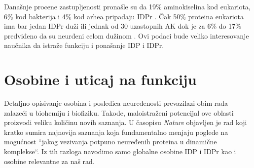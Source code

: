 Današnje procene zastupljenosti pronašle su da 19\% aminokiselina kod
eukariota, 6\% kod bakterija i 4\% kod arhea pripadaju
IDPr \parencite{peng2015b}.  Čak 50\% proteina eukariota ima bar jedan IDPr duži
ili jednak od 30 uzastopnih AK \parencite{Xue2012} dok je za 6\% do 17\%
predviđeno da su neurđeni celom dužinom \parencite{tompa2002}.  Ovi podaci bude
veliko interesovanje naučnika da istraže funkciju i ponašanje IDP i IDPr.

\section {Osobine i uticaj na funkciju}

Detaljno opisivanje osobina i posledica neuređenosti prevazilazi obim rada
zalazeći u biohemiju i biofiziku. Takođe, maloistraženi potencijal ove oblasti
proizvodi veliku količinu novih saznanja.
U časopisu \textit{Nature} objavljen je rad \parencite{rebecca2018} koji
kratko sumira najnovija saznanja koja fundamentalno menjaju poglede na
mogućnost ``jakog vezivanja potpuno neuređenih proteina u dinamične komplekse``.
Iz tih razloga navodimo samo globalne osobine IDP i IDPr kao i osobine
relevantne za naš rad.

